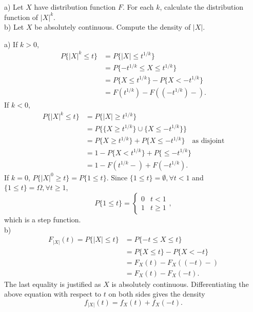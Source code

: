 \begin{exercise}
  a) Let $X$ have distribution function $F$. For each $k$, calculate the distribution function of $|X|^k$. \\
  b) Let $X$ be absolutely continuous. Compute the density of $|X|$.
\end{exercise}
\begin{solution}
  a) If $k>0$,
  \begin{align*}
    P\{|X|^k\leq t\} &= P\{|X|\leq t^{1/k}\} \\
      &= P\{-t^{1/k}\leq X\leq t^{1/k}\} \\
      &= P\{X\leq t^{1/k}\} - P\{X<-t^{1/k}\} \\
      &= F(t^{1/k}) - F((-t^{1/k})-) .
  \end{align*}
  If $k<0$,
  \begin{align*}
    P\{|X|^k\leq t\} &= P\{|X|\geq t^{1/k}\} \\
      &= P\{\{X\geq t^{1/k}\}\cup\{X\leq -t^{1/k}\}\} \\
      &= P\{X\geq t^{1/k}\} + P\{X\leq -t^{1/k}\} \quad \mbox{as disjoint} \\
      &= 1 - P\{X<t^{1/k}\} + P\{\leq -t^{1/k}\} \\
      &= 1 - F(t^{1/k}-) + F(-t^{1/k}) .
  \end{align*}
  If $k=0$, $P\{|X|^0\geq t\} = P\{1\leq t\}$. Since $\{1\leq t\}=\emptyset, \forall t<1$ and $\{1\leq t\}=\Omega, \forall t\geq 1$,
  \[
    P\{1\leq t\} = \begin{cases}
      0 & t < 1 \\
      1 & t \geq 1
    \end{cases},
  \]
  which is a step function. \\

  b) \begin{align*}
    F_{|X|}(t) = P\{|X|\leq t\} &= P\{-t\leq X\leq t\} \\
      &= P\{X\leq t\} - P\{X<-t\} \\
      &= F_X(t) - F_X((-t)-) \\
      &= F_X(t) - F_X(-t) .
  \end{align*}
  The last equality is justified as $X$ is absolutely continuous. Differentiating the above equation with respect to $t$ on both sides gives the density
  \[ f_{|X|}(t) = f_X(t) + f_X(-t) .\]
\end{solution}


